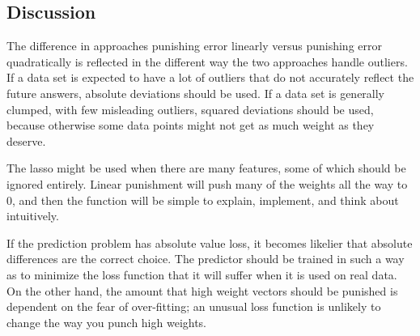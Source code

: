 \documentclass{sigchi}
\begin{document}
\subsection{Discussion}

The difference in approaches punishing error linearly versus punishing error quadratically is reflected in the different way the two approaches handle outliers. If a data set is expected to have a lot of outliers that do not accurately reflect the future answers, absolute deviations should be used. If a data set is generally clumped, with few misleading outliers, squared deviations should be used, because otherwise some data points might not get as much weight as they deserve. 

The lasso  might be used when there are many features, some of which should be ignored entirely. Linear punishment will push many of the weights all the way to 0, and then the function will be simple to explain, implement, and think about intuitively.

If the prediction problem has absolute value loss, it becomes likelier that absolute differences are the correct choice. The predictor should be trained in such a way as to minimize the loss function that it will suffer when it is used on real data. On the other hand, the amount that high weight vectors should be punished is dependent on the fear of over-fitting; an unusual loss function is unlikely to change the way you punch high weights.
\end{document}
